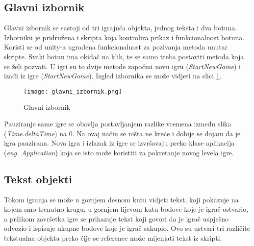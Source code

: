 \subsection{Glavni izbornik}
Glavni izbornik se sastoji od tri igrajuća objekta, jednog teksta i dva botuna. Izborniku je pridružena i skripta koja kontrolira prikaz i funkcionalnost botuna. Koristi se od unity-a ugrađena funkcionalnost za pozivanja metoda unutar skripte. Svaki botun ima okidač na klik, te se samo treba postaviti metoda koja se želi pozvati. U igri su to dvije metode započmi novu igru (\emph{StartNewGame}) i izađi iz igre (\emph{StartNewGame}). Izgled izbornika se može vidjeti na slici \ref{fig:glavniIzbornik}.
\begin{figure}[h]
	\texttt{[image: glavni\_izbornik.png]}
	\centering
	\caption{Glavni izbornik}
	\label{fig:glavniIzbornik}
\end{figure}
\newline
Pauziranje same igre se obavlja postavljanjem razlike vremena između slika (\emph{Time.deltaTime}) na 0. Na ovaj način se ništa ne kreće i dobije se dojam da je igra pauzirana. Nova igra i izlazak iz igre se izvršavaju preko klase aplikacija (\emph{eng. Application}) koja se isto može koristiti za pokretanje novog levela igre.
\newpage
\subsection{Tekst objekti}
Tokom igranja se može u gornjem desnom kutu vidjeti tekst, koji pokazuje na kojem smo trenutno krugu, u gornjem lijevom kutu bodove koje je igrač ostvario, a prilikom završetka igre se prikazuje tekst koji govori da je igrač uspješno odvozio i ispisuje ukupne bodove koje je igrač sakupio. Ovo su ustvari tri različite tekstualna objekta preko čije se reference može mijenjati tekst iz skripti. 